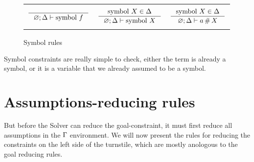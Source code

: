 \documentclass[english, mgr]{iithesis}
\newcommand{\solverRule}{\vdash}
\begin{document}
\begin{figure}[htbp]
    \centering
    \begin{tabularx}{\textwidth}{|CCC|}
      \hline & & \\ $
      \inference{
      }{
        \emptyenv ; \icEnv \solverRule \csymb \symb
      }
      $ & $
      \inference{
        \csymb \termv \in \icEnv
      }{
        \emptyenv ; \icEnv \solverRule \csymb \termv
      }
      $ & $
      \inference{
        \csymb \termv \in \icEnv
      }{
        \emptyenv ; \icEnv \solverRule \atomv \cfresh \termv
      }
      $ \\ & & \\ \hline
      \end{tabularx}
  \caption{Symbol rules}
  \label{fig:symbol-rules}
\end{figure}
Symbol constraints are really simple to check, either the term is already
a symbol, or it is a variable that we already assumed to be a symbol.

\newpage

\section{Assumptions-reducing rules}
But before the Solver can reduce the goal-constraint, it must first reduce all assumptions in the $\Gamma$ environment.
We will now present the rules for reducing the constraints on the left side of the turnstile,
which are mostly anologous to the goal reducing rules.
\end{document}
